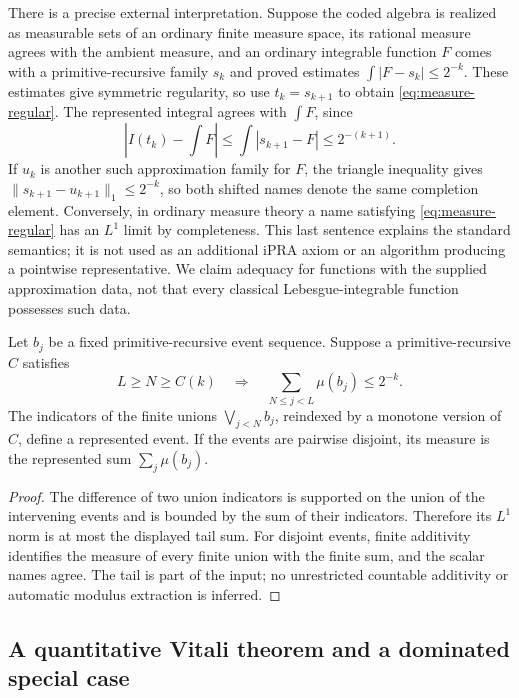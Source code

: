 There is a precise external interpretation.  Suppose the coded algebra is
realized as measurable sets of an ordinary finite measure space, its rational
measure agrees with the ambient measure, and an ordinary integrable function
\(F\) comes with a primitive-recursive family \(s_k\) and proved estimates
\(\int|F-s_k|\leq2^{-k}\).  These estimates give symmetric regularity,
so use \(t_k=s_{k+1}\) to obtain \eqref{eq:measure-regular}.
The represented integral agrees with \(\int F\), since
\[
 \left|I(t_k)-\int F\right|\leq\int|s_{k+1}-F|\leq2^{-(k+1)}.
\]
If \(u_k\) is another such approximation family for \(F\), the triangle
inequality gives \(\|s_{k+1}-u_{k+1}\|_1\leq2^{-k}\), so both shifted
names denote the same completion
element.  Conversely, in ordinary measure theory a name satisfying
\eqref{eq:measure-regular} has an \(L^1\) limit by completeness.  This last
sentence explains the standard semantics; it is not used as an additional
iPRA axiom or an algorithm producing a pointwise representative.  We claim
adequacy for functions with the supplied approximation data, not that every
classical Lebesgue-integrable function possesses such data.

\begin{proposition}
\label{prop:measure-union}
Let \(b_j\) be a fixed primitive-recursive event sequence.  Suppose a
primitive-recursive \(C\) satisfies
\[
 L\geq N\geq C(k)\quad\Longrightarrow\quad
 \sum_{N\leq j<L}\mu(b_j)\leq2^{-k}.
\]
The indicators of the finite unions \(\bigvee_{j<N}b_j\), reindexed by a
monotone version of \(C\), define a represented event.  If the events are
pairwise disjoint, its measure is the represented sum \(\sum_j\mu(b_j)\).
\end{proposition}

\begin{proof}
The difference of two union indicators is supported on the union of the
intervening events and is bounded by the sum of their indicators.  Therefore
its \(L^1\) norm is at most the displayed tail sum.  For disjoint events,
finite additivity identifies the measure of every finite union with the
finite sum, and the scalar names agree.  The tail is part of the input; no
unrestricted countable additivity or automatic modulus extraction is inferred.
\end{proof}

\subsection{A quantitative Vitali theorem and a dominated special case}

